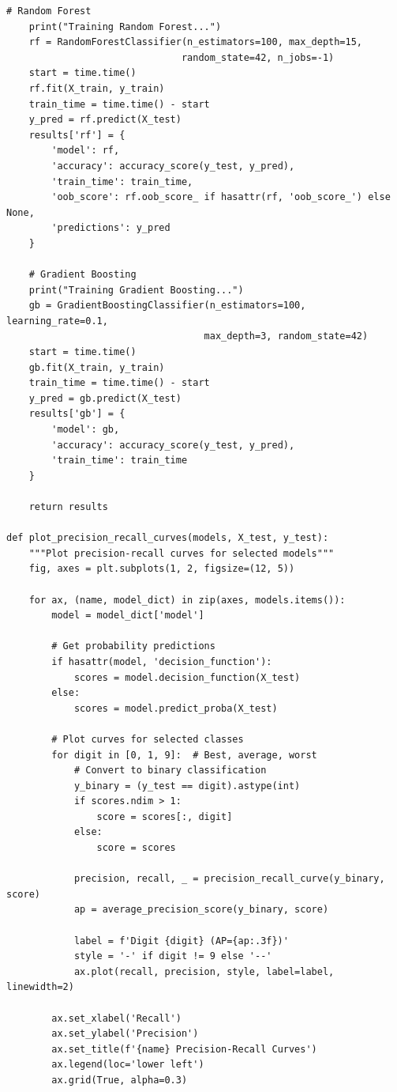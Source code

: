 \documentclass[12pt,a4paper]{article}
\theoremstyle{definition}
\begin{document}
\begin{lstlisting}[caption={MNIST Classification Implementation}]
    # Random Forest
    print("Training Random Forest...")
    rf = RandomForestClassifier(n_estimators=100, max_depth=15, 
                               random_state=42, n_jobs=-1)
    start = time.time()
    rf.fit(X_train, y_train)
    train_time = time.time() - start
    y_pred = rf.predict(X_test)
    results['rf'] = {
        'model': rf,
        'accuracy': accuracy_score(y_test, y_pred),
        'train_time': train_time,
        'oob_score': rf.oob_score_ if hasattr(rf, 'oob_score_') else None,
        'predictions': y_pred
    }
    
    # Gradient Boosting
    print("Training Gradient Boosting...")
    gb = GradientBoostingClassifier(n_estimators=100, learning_rate=0.1,
                                   max_depth=3, random_state=42)
    start = time.time()
    gb.fit(X_train, y_train)
    train_time = time.time() - start
    y_pred = gb.predict(X_test)
    results['gb'] = {
        'model': gb,
        'accuracy': accuracy_score(y_test, y_pred),
        'train_time': train_time
    }
    
    return results

def plot_precision_recall_curves(models, X_test, y_test):
    """Plot precision-recall curves for selected models"""
    fig, axes = plt.subplots(1, 2, figsize=(12, 5))
    
    for ax, (name, model_dict) in zip(axes, models.items()):
        model = model_dict['model']
        
        # Get probability predictions
        if hasattr(model, 'decision_function'):
            scores = model.decision_function(X_test)
        else:
            scores = model.predict_proba(X_test)
        
        # Plot curves for selected classes
        for digit in [0, 1, 9]:  # Best, average, worst
            # Convert to binary classification
            y_binary = (y_test == digit).astype(int)
            if scores.ndim > 1:
                score = scores[:, digit]
            else:
                score = scores
            
            precision, recall, _ = precision_recall_curve(y_binary, score)
            ap = average_precision_score(y_binary, score)
            
            label = f'Digit {digit} (AP={ap:.3f})'
            style = '-' if digit != 9 else '--'
            ax.plot(recall, precision, style, label=label, linewidth=2)
        
        ax.set_xlabel('Recall')
        ax.set_ylabel('Precision')
        ax.set_title(f'{name} Precision-Recall Curves')
        ax.legend(loc='lower left')
        ax.grid(True, alpha=0.3)
    

\end{lstlisting}
\end{document}
